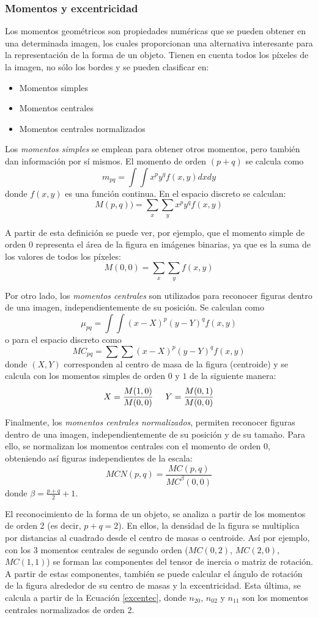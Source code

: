 \subsubsection{Momentos y excentricidad \cite{imageMoments}}

Los momentos geométricos son propiedades numéricas que se pueden obtener en una determinada imagen, los cuales proporcionan una alternativa interesante para la representación de la forma de un objeto. Tienen en cuenta todos los píxeles de la imagen, no sólo los bordes y se pueden clasificar en:

\begin{itemize}
\item Momentos simples
\item Momentos centrales
\item Momentos centrales normalizados
\end{itemize}

Los \textit{momentos simples} se emplean para obtener otros momentos, pero también dan información por sí mismos. El momento de orden $(p+q)$ se calcula como $$m_{pq}={\int}{\int}x^py^qf(x,y)dxdy$$ donde $f(x,y)$ es una función continua. En el espacio discreto se calculan: $$M(p,q))={\sum}_x{\sum}_yx^py^qf(x,y)$$

A partir de esta definición se puede ver, por ejemplo, que el momento simple de orden 0 representa el área de la figura en imágenes binarias, ya que es la suma de los valores de todos los píxeles: $$M(0,0) = {\sum}_x{\sum}_yf(x,y)$$

Por otro lado, los \textit{momentos centrales} son utilizados para reconocer figuras dentro de una imagen, independientemente de su posición. Se calculan como $${\mu}_{pq}={\int}{\int}(x-X)^p(y-Y)^qf(x,y)$$ o para el espacio discreto como $${MC}_{pq}={\sum}{\sum}(x-X)^p(y-Y)^qf(x,y)$$ donde $(X,Y)$ corresponden al centro de masa de la figura (centroide) y se calcula con los momentos simples de orden $0$ y $1$ de la siguiente manera: $$X=\frac{M(1,0)}{M(0,0)} \hspace{5 mm} Y=\frac{M(0,1)}{M(0,0)}$$

Finalmente, los \textit{momentos centrales normalizados}, permiten reconocer figuras dentro de una imagen, independientemente de su posición y de su tamaño. Para ello, se normalizan los momentos centrales con el momento de orden $0$, obteniendo así figuras independientes de la escala: $$MCN(p,q) = \frac{MC(p,q)}{MC^{\beta}(0,0)}$$ donde ${\beta}=\frac{p+q}{2}+1$.

El reconocimiento de la forma de un objeto, se analiza a partir de los momentos de orden 2 (es decir, $p+q=2$). En ellos, la densidad de la figura se multiplica por distancias al cuadrado desde el centro de masas o centroide. Así por ejemplo, con los 3 momentos centrales de segundo orden ($MC(0,2)$, $MC(2,0)$, $MC(1,1)$) se forman las componentes del tensor de inercia o matriz de rotación. A partir de estas componentes, también se puede calcular el ángulo de rotación de la figura alrededor de su centro de masas y la excentricidad. Esta última, se calcula a partir de la Ecuación \ref{excentec}, donde $n_{20}$, $n_{02}$ y $n_{11}$ son los momentos centrales normalizados de orden 2.

